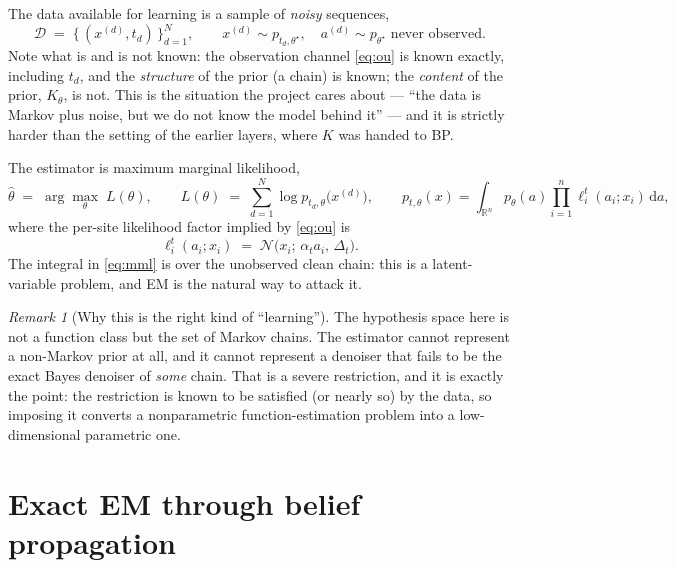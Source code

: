 \documentclass[11pt]{article}
\theoremstyle{remark}
\newtheorem{remark}{Remark}
\newcommand{\R}{\mathbb{R}}
\newcommand{\Normal}{\mathcal{N}}
\newcommand{\dd}{\,\mathrm{d}}
\begin{document}
The data available for learning is a sample of \emph{noisy} sequences,
\begin{equation}
  \mathcal{D} \;=\; \bigl\{\, (x^{(d)}, t_d) \,\bigr\}_{d=1}^{N},
  \qquad
  x^{(d)} \sim p_{t_d,\theta^\star}, \quad
  a^{(d)} \sim p_{\theta^\star} \text{ never observed}.
\end{equation}
Note what is and is not known: the observation channel \eqref{eq:ou} is known
exactly, including $t_d$, and the \emph{structure} of the prior (a chain) is
known; the \emph{content} of the prior, $K_\theta$, is not. This is the
situation the project cares about --- ``the data is Markov plus noise, but we do
not know the model behind it'' --- and it is strictly harder than the setting of
the earlier layers, where $K$ was handed to BP.

The estimator is maximum marginal likelihood,
\begin{equation}
  \hat\theta \;=\; \arg\max_{\theta}\; L(\theta),
  \qquad
  L(\theta) \;=\; \sum_{d=1}^{N} \log p_{t_d,\theta}\bigl(x^{(d)}\bigr),
  \qquad
  p_{t,\theta}(x) = \int_{\R^n} p_\theta(a) \prod_{i=1}^{n} \ell^t_i(a_i; x_i) \dd a,
  \label{eq:mml}
\end{equation}
where the per-site likelihood factor implied by \eqref{eq:ou} is
\begin{equation}
  \ell^t_i(a_i; x_i) \;=\; \Normal\bigl(x_i;\, \alpha_t a_i,\, \Delta_t\bigr).
  \label{eq:likelihood}
\end{equation}
The integral in \eqref{eq:mml} is over the unobserved clean chain: this is a
latent-variable problem, and EM is the natural way to attack it.

\begin{remark}[Why this is the right kind of ``learning'']
The hypothesis space here is not a function class but the set of Markov chains.
The estimator cannot represent a non-Markov prior at all, and it cannot
represent a denoiser that fails to be the exact Bayes denoiser of \emph{some}
chain. That is a severe restriction, and it is exactly the point: the
restriction is known to be satisfied (or nearly so) by the data, so imposing it
converts a nonparametric function-estimation problem into a low-dimensional
parametric one.
\end{remark}

\section{Exact EM through belief propagation}
\label{sec:em}
\end{document}
